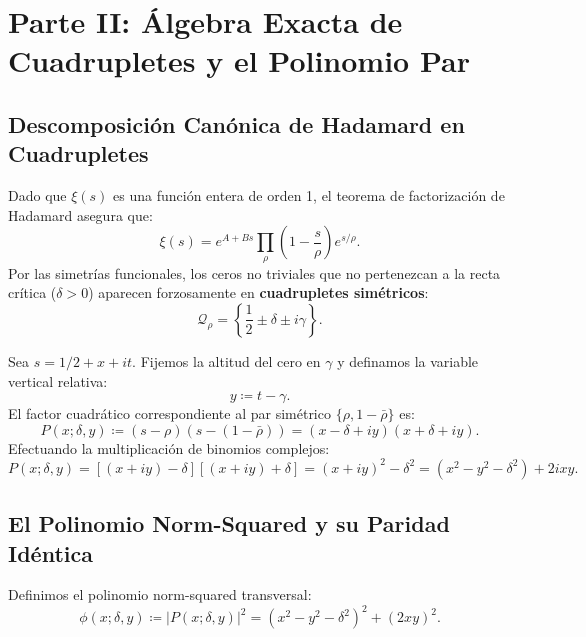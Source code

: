 \documentclass[11pt,a4paper]{article}
\theoremstyle{definition}
\theoremstyle{remark}
\begin{document}
\section{Parte II: Álgebra Exacta de Cuadrupletes y el Polinomio Par}

\subsection{Descomposición Canónica de Hadamard en Cuadrupletes}

Dado que $\xi(s)$ es una función entera de orden 1, el teorema de factorización de Hadamard asegura que:
\begin{equation}
\xi(s) = e^{A + Bs} \prod_\rho \left( 1 - \frac{s}{\rho} \right) e^{s/\rho}.
\end{equation}
Por las simetrías funcionales, los ceros no triviales que no pertenezcan a la recta crítica ($\delta > 0$) aparecen forzosamente en \textbf{cuadrupletes simétricos}:
\begin{equation}
\mathcal{Q}_\rho = \left\{ \frac{1}{2} \pm \delta \pm i\gamma \right\}.
\end{equation}

Sea $s = 1/2 + x + it$. Fijemos la altitud del cero en $\gamma$ y definamos la variable vertical relativa:
\begin{equation}
y \coloneqq t - \gamma.
\end{equation}
El factor cuadrático correspondiente al par simétrico $\{\rho, 1 - \bar{\rho}\}$ es:
\begin{equation}
P(x; \delta, y) \coloneqq (s - \rho)(s - (1 - \bar{\rho})) = (x - \delta + iy)(x + \delta + iy).
\end{equation}
Efectuando la multiplicación de binomios complejos:
\begin{equation}
P(x; \delta, y) = [(x + iy) - \delta][(x + iy) + \delta] = (x + iy)^2 - \delta^2 = (x^2 - y^2 - \delta^2) + 2ixy.
\end{equation}

\subsection{El Polinomio Norm-Squared y su Paridad Idéntica}

Definimos el polinomio norm-squared transversal:
\begin{equation}
\phi(x; \delta, y) \coloneqq |P(x; \delta, y)|^2 = (x^2 - y^2 - \delta^2)^2 + (2xy)^2.
\end{equation}
\end{document}
